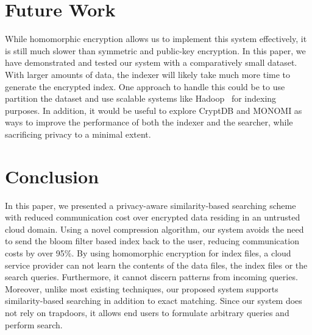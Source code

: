 \section{Future Work}

While homomorphic encryption allows us to implement this system effectively, 
it is still much slower than symmetric and public-key encryption.
In this paper, we have demonstrated and tested our system with a comparatively 
small dataset. With larger amounts of data, the indexer will likely take 
much more time to generate the
encrypted index. One approach to handle this could be to use partition the
dataset and use scalable systems like Hadoop~\cite{hadoop} for indexing
purposes. In addition, it would be useful to explore CryptDB and MONOMI as
ways to improve the performance of both the indexer and the searcher, while
sacrificing privacy to a minimal extent.


\section{Conclusion}
\label{sec:conclusion}

In this paper, we presented a privacy-aware similarity-based searching scheme
with reduced communication cost over encrypted data residing in an untrusted
cloud domain. Using a novel compression 
algorithm, our system avoids the need to send the bloom filter based index back to the 
user, reducing communication costs by over 95\%.
By using homomorphic encryption for index files, a cloud service provider can not learn the contents of 
the data files, the index files or the search queries. Furthermore, it cannot 
discern patterns from incoming queries. Moreover, unlike most existing techniques, our
proposed system supports similarity-based searching in addition to exact matching.
Since our system does not rely on trapdoors, it allows end users to formulate
arbitrary queries and perform search. 
